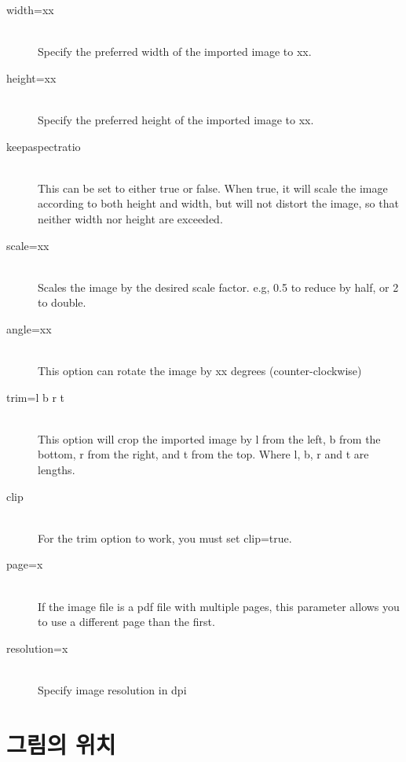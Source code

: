 			\begin{description}
			\item[width=xx] \hfill \\
			Specify the preferred width of the imported image to xx.	 
			\item[height=xx] \hfill \\
			Specify the preferred height of the imported image to xx.
			\item[keepaspectratio] \hfill \\
			This can be set to either true or false. When true, 
			it will scale the image according to both height and width, but will not distort the image, 
			so that neither width nor height are exceeded.
			
			\item[scale=xx] \hfill \\
			Scales the image by the desired scale factor. e.g, 0.5 to reduce by half, or 2 to double.
			
			\item[angle=xx] \hfill \\
			This option can rotate the image by xx degrees (counter-clockwise)
			
			\item[trim=l b r t] \hfill \\
			This option will crop the imported image by l from the left, 
			b from the bottom, r from the right, and t from the top. Where l, b, r and t are lengths.
			
			\item[clip] \hfill  \\
			For the trim option to work, you must set clip=true.
			
			\item[page=x] \hfill \\
			If the image file is a pdf file with multiple pages, 
			this parameter allows you to use a different page than the first.
			\item[resolution=x]	\hfill  \\
			Specify image resolution in dpi
			\end{description}
	
	




\newpage
\section{그림의 위치}

